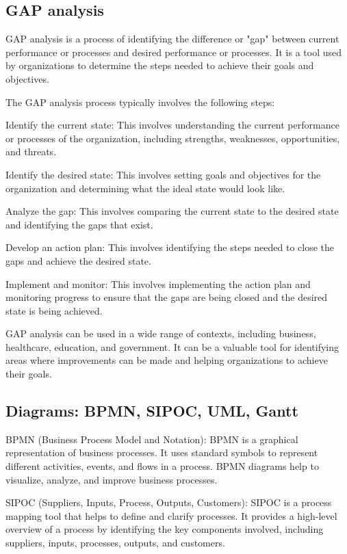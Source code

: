 \documentclass[12pt, a4paper, oneside]{article}
\begin{document}
\subsection{ GAP analysis }
GAP analysis is a process of identifying the difference or "gap" between current performance or processes and desired performance or processes. It is a tool used by organizations to determine the steps needed to achieve their goals and objectives.

The GAP analysis process typically involves the following steps:

Identify the current state: This involves understanding the current performance or processes of the organization, including strengths, weaknesses, opportunities, and threats.

Identify the desired state: This involves setting goals and objectives for the organization and determining what the ideal state would look like.

Analyze the gap: This involves comparing the current state to the desired state and identifying the gaps that exist.

Develop an action plan: This involves identifying the steps needed to close the gaps and achieve the desired state.

Implement and monitor: This involves implementing the action plan and monitoring progress to ensure that the gaps are being closed and the desired state is being achieved.

GAP analysis can be used in a wide range of contexts, including business, healthcare, education, and government. It can be a valuable tool for identifying areas where improvements can be made and helping organizations to achieve their goals.

\subsection{ Diagrams: BPMN, SIPOC, UML, Gantt }
BPMN (Business Process Model and Notation): BPMN is a graphical representation of business processes. It uses standard symbols to represent different activities, events, and flows in a process. BPMN diagrams help to visualize, analyze, and improve business processes.

SIPOC (Suppliers, Inputs, Process, Outputs, Customers): SIPOC is a process mapping tool that helps to define and clarify processes. It provides a high-level overview of a process by identifying the key components involved, including suppliers, inputs, processes, outputs, and customers.
\end{document}
